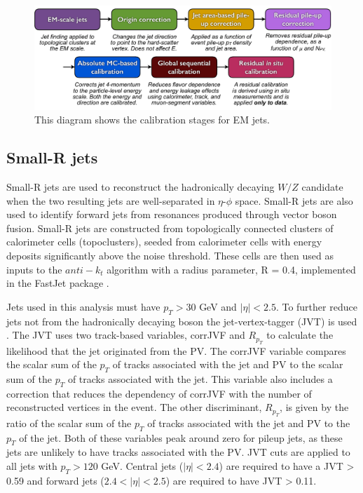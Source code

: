 \begin{figure}[h!]
  \centering
  \includegraphics[width=\hsize]{figures/Analysis/jetcalib.pdf}
  \caption{\cite{jetcalib} This diagram shows the calibration stages for EM jets.} 
  \label{fig:jetcalib}
\end{figure} 
\FloatBarrier

\subsection{Small-R jets}
Small-R jets are used to reconstruct the hadronically decaying $W/Z$ candidate when the two resulting jets are well-separated in $\eta$-$\phi$ space. Small-R jets are also used to identify forward jets from resonances produced through vector boson fusion. Small-R jets are constructed from topologically connected clusters of calorimeter cells (topoclusters), seeded from calorimeter cells with energy deposits significantly above the noise threshold.  These cells are then used as inputs to the $anti-k_{t}$ algorithm \cite{antikt} with a radius parameter, R = 0.4, implemented in the FastJet package \cite{fastjet}. 

Jets used in this analysis must have $p_{T} > 30$ GeV and $|\eta| < 2.5$. To further reduce jets not from the hadronically decaying boson the jet-vertex-tagger (JVT) is used \cite{jvt}. The JVT uses two track-based variables, corrJVF and $R_{p_{T}}$ to calculate the likelihood that the jet originated from the PV. The corrJVF variable compares the scalar sum of the $p_{T}$ of tracks associated with the jet and PV to the scalar sum of the $p_{T}$ of tracks associated with the jet. This variable also includes a correction that reduces the dependency of corrJVF with the number of reconstructed vertices in the event. The other discriminant, $R_{p_{T}}$, is given by the ratio of the scalar sum of the $p_{T}$ of tracks associated with the jet and PV to the $p_{T}$ of the jet. Both of these variables peak around zero for pileup jets, as these jets are unlikely to have tracks associated with the PV. JVT cuts are applied to all jets with $p_{T} > 120$ GeV. Central jets ($|\eta| < 2.4$) are required to have a JVT > 0.59 and forward jets ($2.4<|\eta| < 2.5$) are required to have JVT > 0.11. 


